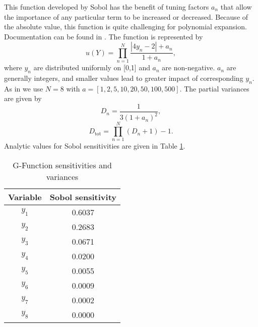 This function developed by Sobol has the benefit of tuning factors $a_n$ that allow the importance of any
particular term to be increased or decreased.  Because of the absolute value, this function is quite
challenging for polynomial expansion.  Documentation can be found in \cite{sobol2003}.  The function is
represented by
\begin{equation}
  u(Y) = \prod_{n=1}^N \frac{|4y_n - 2|+a_n}{1+a_n},
\end{equation}
where $y_n$ are distributed uniformly on [0,1] and $a_n$ are non-negative.  $a_n$ are generally integers, and
smaller values lead to greater impact of corresponding $y_n$.  As in \cite{sudret2007} we use $N=8$ with
$a=[1,2,5,10,20,50,100,500]$.  The partial variances are given by
\begin{equation}
  D_n = \frac{1}{3(1+a_n)^2},
\end{equation}
\begin{equation}
  D_\text{tot} = \prod_{n=1}^N (D_n+1)-1.
\end{equation}
Analytic values for Sobol sensitivities are given in Table \ref{tab:gfunc sens}.
\begin{table}[h]
  \centering
  \begin{tabular}{c|c}
    Variable & Sobol sensitivity \\ \hline
    $y_1$ & 0.6037 \\
    $y_2$ & 0.2683 \\
    $y_3$ & 0.0671 \\
    $y_4$ & 0.0200 \\
    $y_5$ & 0.0055 \\
    $y_6$ & 0.0009 \\
    $y_7$ & 0.0002 \\
    $y_8$ & 0.0000 \\
  \end{tabular}
  \caption{G-Function sensitivities and variances}
  \label{tab:gfunc sens}
\end{table}
